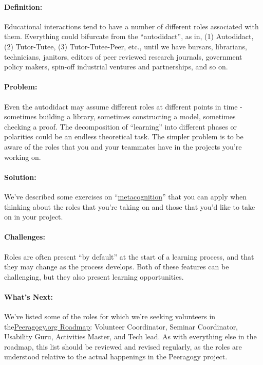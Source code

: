 \paragraph{Definition:} Educational interactions tend to have a number of
different roles associated with them. Everything could bifurcate from
the ``autodidact'', as in, (1) Autodidact, (2) Tutor-Tutee, (3)
Tutor-Tutee-Peer, etc., until we have bursars, librarians, technicians,
janitors, editors of peer reviewed research journals, government policy
makers, spin-off industrial ventures and partnerships, and so on.

\paragraph{Problem:} Even the autodidact may assume different roles at
different points in time - sometimes building a library, sometimes
constructing a model, sometimes checking a proof. The decomposition of
``learning'' into different phases or polarities could be an endless
theoretical task. The simpler problem is to be aware of the roles that
you and your teammates have in the projects you're working on.

\paragraph{Solution:} We've described some exercises on
``\href{http://peeragogy.org/can-we-work-together/}{metacognition}''
that you can apply when thinking about the roles that you're taking on
and those that you'd like to take on in your project.

\paragraph{Challenges:} Roles are often present ``by default'' at the start
of a learning process, and that they may change as the process develops.
Both of these features can be challenging, but they also present
learning opportunities.

\paragraph{What's Next:} We've listed some of the roles for which we're
seeking volunteers in
the\href{http://peeragogy.org/peeragogy-org-roadmap/}{Peeragogy.org
Roadmap}: Volunteer Coordinator, Seminar Coordinator, Usability Guru,
Activities Master, and Tech lead. As with everything else in the
roadmap, this list should be reviewed and revised regularly, as the
roles are understood relative to the actual happenings in the Peeragogy
project.
